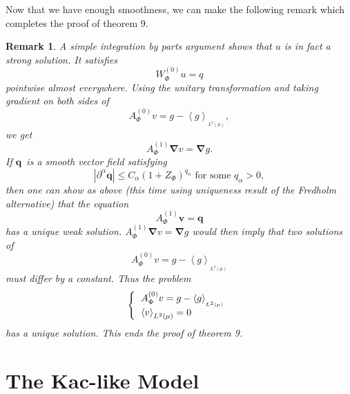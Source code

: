 \documentclass{article}
\newtheorem{remark}[theorem]{Remark}
\begin{document}
Now that we have enough smoothness, we can make the following remark which
completes the proof of theorem 9.

\begin{remark}
A simple integration by parts argument shows that $u$ is in fact a strong
solution. It satisfies%
\begin{equation*}
W_{\Phi }^{(0)}u=q
\end{equation*}%
pointwise almost everywhere. Using the unitary transformation and taking
gradient on both sides of%
\begin{equation*}
A_{\Phi }^{(0)}v=g-\left\langle g\right\rangle _{_{L^{2}(\mu )}},
\end{equation*}%
we get 
\begin{equation*}
A_{\Phi }^{(1)}\mathbf{\nabla }v=\mathbf{\nabla }g.
\end{equation*}%
If $\mathbf{q}$\ is a smooth vector field satisfying 
\begin{equation}
\left| \partial ^{\alpha }\mathbf{q}\right| \leq C_{\alpha }(1+Z_{\Phi
})^{q_{\alpha }}\text{ \ \ for some\ }q_{\alpha }>0,
\end{equation}%
then one can show as above (this time using uniqueness result of the
Fredholm alternative) that the equation 
\begin{equation*}
A_{\Phi }^{(1)}\mathbf{v}=\mathbf{q}
\end{equation*}%
has a unique weak solution.\newline
$A_{\Phi }^{(1)}\mathbf{\nabla }v=\mathbf{\nabla }g$ would then imply that
two solutions of $\ $%
\begin{equation}
A_{\Phi }^{(0)}v=g-\left\langle g\right\rangle _{_{L^{2}(\mu )}}
\end{equation}%
must differ by a constant. Thus the problem 
\begin{equation*}
\left\{ 
\begin{tabular}{l}
$A_{\Phi }^{(0)}v=g-\left\langle g\right\rangle _{_{L^{2}(\mu )}}$ \\ 
$\left\langle v\right\rangle _{L^{2}(\mu )}=0$%
\end{tabular}%
\right.
\end{equation*}%
has a unique solution. This ends the proof of theorem 9.
\end{remark}

\section{The Kac-like Model}
\end{document}
